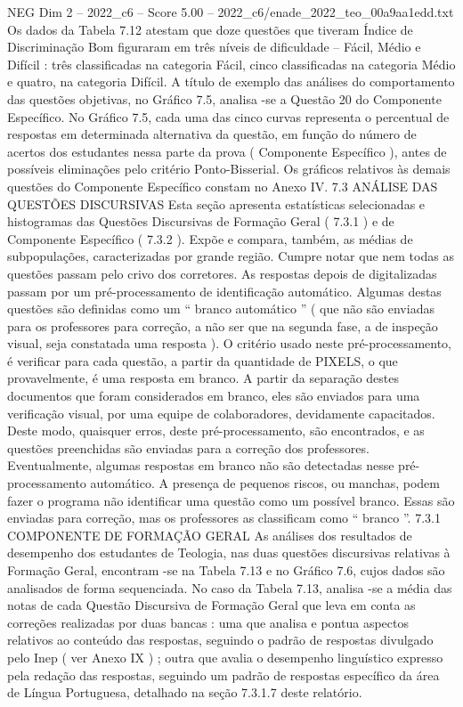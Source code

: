\begin{textsample}{NEG Dim 2 – 2022\_c6 – Score 5.00 – 2022\_c6/enade\_2022\_teo\_00a9aa1edd.txt}
Os dados da Tabela 7.12 atestam que doze questões que tiveram Índice de Discriminação Bom figuraram em três níveis de dificuldade – Fácil, Médio e Difícil : três classificadas na categoria Fácil, cinco classificadas na categoria Médio e quatro, na categoria Difícil.
A título de exemplo das análises do comportamento das questões objetivas, no Gráfico 7.5, analisa -se a Questão 20 do Componente Específico.
No Gráfico 7.5, cada uma das cinco curvas representa o percentual de respostas em determinada alternativa da questão, em função do número de acertos dos estudantes nessa parte da prova ( Componente Específico ), antes de possíveis eliminações pelo critério Ponto-Bisserial.
Os gráficos relativos às demais questões do Componente Específico constam no Anexo IV. 7.3 ANÁLISE DAS QUESTÕES DISCURSIVAS Esta seção apresenta estatísticas selecionadas e histogramas das Questões Discursivas de Formação Geral ( 7.3.1 ) e de Componente Específico ( 7.3.2 ).
Expõe e compara, também, as médias de subpopulações, caracterizadas por grande região.
Cumpre notar que nem todas as questões passam pelo crivo dos corretores.
As respostas depois de digitalizadas passam por um pré-processamento de identificação automático.
Algumas destas questões são definidas como um “ branco automático ” ( que não são enviadas para os professores para correção, a não ser que na segunda fase, a de inspeção visual, seja constatada uma resposta ).
O critério usado neste pré-processamento, é verificar para cada questão, a partir da quantidade de PIXELS, o que provavelmente, é uma resposta em branco.
A partir da separação destes documentos que foram considerados em branco, eles são enviados para uma verificação visual, por uma equipe de colaboradores, devidamente capacitados.
Deste modo, quaisquer erros, deste pré-processamento, são encontrados, e as questões preenchidas são enviadas para a correção dos professores.
Eventualmente, algumas respostas em branco não são detectadas nesse pré-processamento automático.
A presença de pequenos riscos, ou manchas, podem fazer o programa não identificar uma questão como um possível branco.
Essas são enviadas para correção, mas os professores as classificam como “ branco ”. 7.3.1 COMPONENTE DE FORMAÇÃO GERAL As análises dos resultados de desempenho dos estudantes de Teologia, nas duas questões discursivas relativas à Formação Geral, encontram -se na Tabela 7.13 e no Gráfico 7.6, cujos dados são analisados de forma sequenciada.
No caso da Tabela 7.13, analisa -se a média das notas de cada Questão Discursiva de Formação Geral que leva em conta as correções realizadas por duas bancas : uma que analisa e pontua aspectos relativos ao conteúdo das respostas, seguindo o padrão de respostas divulgado pelo Inep ( ver Anexo IX ) ; outra que avalia o desempenho linguístico expresso pela redação das respostas, seguindo um padrão de respostas específico da área de Língua Portuguesa, detalhado na seção 7.3.1.7 deste relatório.

\end{textsample}
